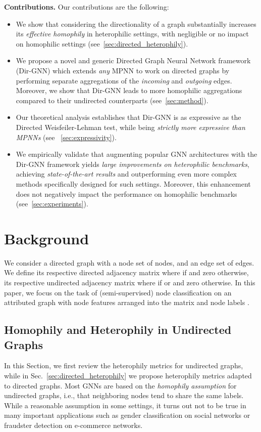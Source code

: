 \documentclass{article}
\newcommand\ours{Directed Graph Neural Network}
\newcommand\oursacro{Dir-GNN}
\theoremstyle{plain}
\theoremstyle{definition}
\theoremstyle{remark}
\begin{document}
\textbf{Contributions.} 
Our contributions are the following:
\begin{itemize}[leftmargin=*]
    \setlength\itemsep{-0em}
    \item We show that considering the directionality of a graph substantially increases its \textit{effective homophily} in heterophilic settings, with negligible or no impact on homophilic settings (see~\cref{sec:directed_heterophily}). 
    \item We propose a novel and generic \ours{} framework (\oursacro{}) which extends \emph{any} MPNN to work on directed graphs by performing separate aggregations of the \emph{incoming} and \emph{outgoing} edges. Moreover, we show that \oursacro{} leads to more homophilic aggregations compared to their undirected counterparts (see~\cref{sec:method}). 
    \item Our theoretical analysis establishes that \oursacro{} is as expressive as the Directed Weisfeiler-Lehman test, while being \emph{strictly more expressive than MPNNs} (see ~\cref{sec:expressivity}).
    \item We empirically validate that augmenting popular GNN architectures with the \oursacro{} framework yields \emph{large improvements on heterophilic benchmarks}, achieving \emph{state-of-the-art results} and outperforming even more complex methods specifically designed for such settings. Moreover, this enhancement does not negatively impact the performance on homophilic benchmarks (see~\cref{sec:experiments}).
\end{itemize} \section{Background}
\label{sec:background}

We consider a directed graph  with a node set  of  nodes, and an edge set  of  edges. We define its respective directed adjacency matrix  where  if  and zero otherwise, its respective undirected adjacency matrix  where  if  or  and zero otherwise.
In this paper, we focus on the task of (semi-supervised) node classification on an attributed graph  with node features arranged into the  matrix  and node labels .

\subsection{Homophily and Heterophily in Undirected Graphs} \label{sec:heterophily_in_gnns}

In this Section, we first review the heterophily metrics for undirected graphs, while in Sec.~\ref{sec:directed_heterophily} we propose heterophily metrics adapted to directed graphs. Most GNNs are based on the \textit{homophily assumption} for undirected graphs, i.e., that neighboring nodes tend to share the same labels. 
While a reasonable assumption in some settings, it turns out not to be true in many important applications such as gender classification on social networks or fraudster detection on e-commerce networks. 
\end{document}

